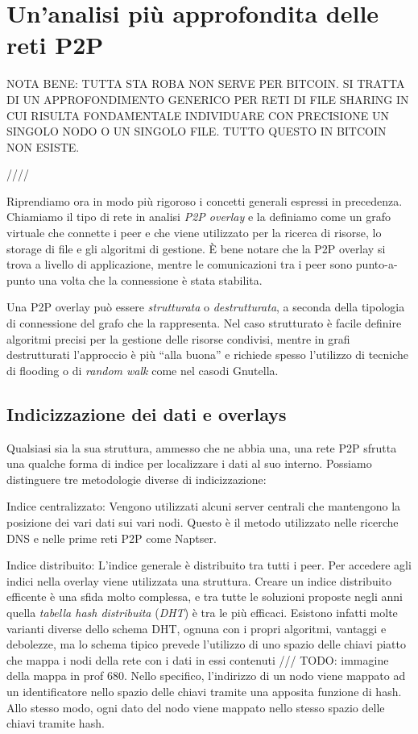 \chapter{Un'analisi più approfondita delle reti P2P}\label{unanalisi-piuxf9-approfondita-delle-reti-p2p}

NOTA BENE: TUTTA STA ROBA NON SERVE PER BITCOIN. SI TRATTA DI UN APPROFONDIMENTO GENERICO PER RETI DI FILE SHARING IN CUI RISULTA FONDAMENTALE INDIVIDUARE CON PRECISIONE UN SINGOLO NODO O UN SINGOLO FILE. TUTTO QUESTO IN BITCOIN NON ESISTE.

////

Riprendiamo ora in modo più rigoroso i concetti generali espressi in precedenza. Chiamiamo il tipo di rete in analisi \emph{P2P overlay} e la definiamo come un grafo virtuale che connette i peer e che viene utilizzato per la ricerca di risorse, lo storage di file e gli algoritmi di gestione. È bene notare che la P2P overlay si trova a livello di applicazione, mentre le comunicazioni tra i peer sono punto-a-punto una volta che la connessione è stata stabilita.

Una P2P overlay può essere \emph{strutturata} o \emph{destrutturata}, a seconda della tipologia di connessione del grafo che la rappresenta. Nel caso strutturato è facile definire algoritmi precisi per la gestione delle risorse condivisi, mentre in grafi destrutturati l'approccio è più ``alla buona'' e richiede spesso l'utilizzo di tecniche di flooding o di \emph{random walk} come nel casodi Gnutella.

\section{Indicizzazione dei dati e overlays}\label{indicizzazione-dei-dati-e-overlays}

Qualsiasi sia la sua struttura, ammesso che ne abbia una, una rete P2P sfrutta una qualche forma di indice per localizzare i dati al suo interno. Possiamo distinguere tre metodologie diverse di indicizzazione:

Indice centralizzato: Vengono utilizzati alcuni server centrali che mantengono la posizione dei vari dati sui vari nodi. Questo è il metodo utilizzato nelle ricerche DNS e nelle prime reti P2P come Naptser.

Indice distribuito: L'indice generale è distribuito tra tutti i peer. Per accedere agli indici nella overlay viene utilizzata una struttura. Creare un indice distribuito efficente è una sfida molto complessa, e tra tutte le soluzioni proposte negli anni quella \emph{tabella hash distribuita} (\emph{DHT}) è tra le più efficaci. Esistono infatti molte varianti diverse dello schema DHT, ognuna con i propri algoritmi, vantaggi e debolezze, ma lo schema tipico prevede l'utilizzo di uno spazio delle chiavi piatto che mappa i nodi della rete con i dati in essi contenuti /// TODO: immagine della mappa in prof 680. Nello specifico, l'indirizzo di un nodo viene mappato ad un identificatore nello spazio delle chiavi tramite una apposita funzione di hash. Allo stesso modo, ogni dato del nodo viene mappato nello stesso spazio delle chiavi tramite hash.

